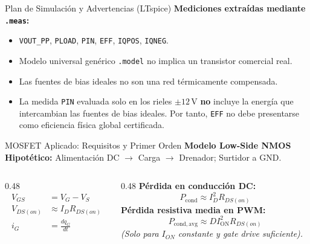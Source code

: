\documentclass[aspectratio=169, table]{beamer}
\begin{document}
\begin{frame}{Plan de Simulación y Advertencias (LTspice)}
    \textbf{Mediciones extraídas mediante \texttt{.meas}:}
    \begin{itemize}
        \item \texttt{VOUT\_PP}, \texttt{PLOAD}, \texttt{PIN}, \texttt{EFF}, \texttt{IQPOS}, \texttt{IQNEG}.
    \end{itemize}
    
    \begin{tcolorbox}[colback=red!5, colframe=red!70!black, title=Limitaciones del Modelo Idealizado {}]
        \begin{itemize}
            \item Modelo universal genérico \texttt{.model} no implica un transistor comercial real.
            \item Las fuentes de bias ideales no son una red térmicamente compensada.
            \item La medida \texttt{PIN} evaluada solo en los rieles $\pm 12\,\text{V}$ \textbf{no} incluye la energía que intercambian las fuentes de bias ideales. Por tanto, \texttt{EFF} no debe presentarse como eficiencia física global certificada.
        \end{itemize}
    \end{tcolorbox}
\end{frame}

\begin{frame}{MOSFET Aplicado: Requisitos y Primer Orden}
    \textbf{Modelo Low-Side NMOS Hipotético:} Alimentación DC $\rightarrow$ Carga $\rightarrow$ Drenador; Surtidor a GND.
    
    \begin{columns}[T]
        \begin{column}{0.48\textwidth}
            \begin{align*}
                V_{GS} &= V_G - V_S \text{} \\
                V_{DS(on)} &\approx I_D R_{DS(on)} \text{} \\
                i_G &= \frac{dq_G}{dt} \text{}
            \end{align*}
        \end{column}
        \begin{column}{0.48\textwidth}
            \textbf{Pérdida en conducción DC:}
            \begin{equation*}
                \boxed{P_{\mathrm{cond}} \approx I_D^2 R_{DS(on)}} \text{}
            \end{equation*}
            \textbf{Pérdida resistiva media en PWM:}
            \begin{equation*}
                \boxed{P_{\mathrm{cond,avg}} \approx D I_{\mathrm{ON}}^2 R_{DS(on)}} \text{}
            \end{equation*}
            \textit{(Solo para $I_{ON}$ constante y gate drive suficiente).}
        \end{column}
    \end{columns}
\end{frame}
\end{document}
